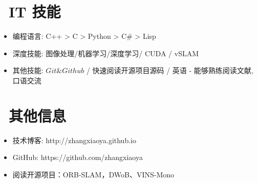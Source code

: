 \documentclass{resume}
\begin{document}

\section{\faCogs\ IT 技能}
\begin{itemize}[parsep=0.5ex]
  \item 编程语言: C++ > C > Python > C\# > Lisp
  \item 深度技能: 图像处理/机器学习/深度学习/ CUDA / vSLAM
  \item 其他技能: $Git\& Github$ / 快速阅读开源项目源码 / 英语 - 能够熟练阅读文献,口语交流
\end{itemize}

\section{\faInfo\ 其他信息}
\begin{itemize}[parsep=0.5ex]
  \item 技术博客: http://zhangxiaoya.github.io
  \item GitHub: https://github.com/zhangxiaoya
  \item 阅读开源项目：ORB-SLAM，DWoB、VINS-Mono
\end{itemize}
\end{document}
